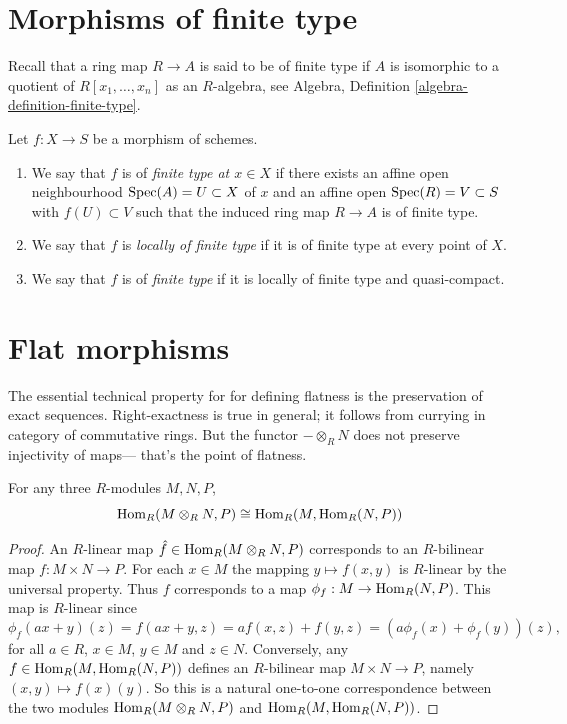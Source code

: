 \section{Morphisms of finite type}
\label{section-finite-type}

\noindent
Recall that a ring map $R \to A$ is said to be of finite type if
$A$ is isomorphic to a quotient of $R[x_1, \ldots, x_n]$ as an $R$-algebra, see
Algebra, Definition \ref{algebra-definition-finite-type}.

\begin{definition}
\label{definition-finite-type}
Let $f : X \to S$ be a morphism of schemes.
\begin{enumerate}
\item We say that $f$ is of {\it finite type at $x \in X$} if
there exists an affine open neighbourhood $\mathop{\mathrm{Spec}}(A) = U \subset X$
of $x$ and an affine open $\mathop{\mathrm{Spec}}(R) = V \subset S$
with $f(U) \subset V$ such that the induced ring map
$R \to A$ is of finite type.
\item We say that $f$ is {\it locally of finite type} if it is
of finite type at every point of $X$.
\item We say that $f$ is of {\it finite type} if it is locally of
finite type and quasi-compact.
\end{enumerate}
\end{definition}

\section{Flat morphisms}
\label{section-flat-morphisms}

\noindent
The essential technical property
for for defining flatness
is the preservation of exact sequences.
Right-exactness is true in general;
it follows from currying in category
of commutative rings.
But the functor $-\otimes_R N$ does not
preserve injectivity of maps---
that's the point of flatness.

\begin{lemma}
\label{lemma-hom-from-tensor-product}
For any three $R$-modules $M, N, P$,
$$
\mathop{\mathrm{Hom}}\nolimits_R(M \otimes_R N, P) \cong \mathop{\mathrm{Hom}}\nolimits_R(M, \mathop{\mathrm{Hom}}\nolimits_R(N, P))
$$
\end{lemma}

\begin{proof}
An $R$-linear map $\hat{f}\in \mathop{\mathrm{Hom}}\nolimits_R(M \otimes_R N, P)$ corresponds to an
$R$-bilinear map $f : M \times N \to P$. For
each $x\in M$ the mapping $y\mapsto f(x, y)$ is $R$-linear by the universal
property. Thus $f$ corresponds to a
map $\phi_f : M \to \mathop{\mathrm{Hom}}\nolimits_R(N, P)$. This map is $R$-linear since
$$
\phi_f(ax + y)(z) =
f(ax + y, z) = af(x, z)+f(y, z) =
(a\phi_f(x)+\phi_f(y))(z),
$$
for all $a \in R$, $x \in M$, $y \in M$ and
$z \in N$. Conversely, any
$f \in \mathop{\mathrm{Hom}}\nolimits_R(M, \mathop{\mathrm{Hom}}\nolimits_R(N, P))$ defines an $R$-bilinear
map $M \times N \to P$, namely $(x, y)\mapsto f(x)(y)$.
So this is a natural one-to-one correspondence between the
two modules
$\mathop{\mathrm{Hom}}\nolimits_R(M \otimes_R N, P)$ and $\mathop{\mathrm{Hom}}\nolimits_R(M, \mathop{\mathrm{Hom}}\nolimits_R(N, P))$.
\end{proof}

